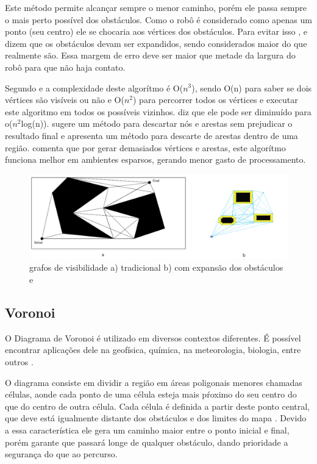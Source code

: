 Este método permite alcançar sempre o menor caminho, porém ele passa sempre o mais perto possível dos obstáculos. Como o robô é considerado como apenas um ponto (seu centro) ele se chocaria aos vértices dos obstáculos. Para evitar isso \cite{Souza2008}, \cite{Siegwart2004} e \cite{Thomsen2010} dizem que os obstáculos devam ser expandidos, sendo considerados maior do que realmente são. Essa margem de erro deve ser maior que metade da largura do robô para que não haja contato.

Segundo \cite{Thomsen2010} e \cite{Choset2005} a complexidade deste algorítmo é O($n^3$), sendo O(n) para saber se dois vértices são visíveis ou não e O($n^2$) para percorrer todos os vértices e executar este algoritmo em todos os possíveis vizinhos. \cite{Thomsen2010} diz que ele pode ser diminuído para o($n^2$log(n)). \cite{Medeiros2011} sugere um método para descartar nós e arestas sem prejudicar o resultado final e \cite{Choset2005} apresenta um método para descarte de arestas dentro de uma região. \cite{Siegwart2004} comenta que por gerar demasiados vértices e arestas, este algorítmo funciona melhor em ambientes esparsos, gerando menor gasto de processamento.

\begin{figure}[h]
	\centering
	\label{fig07}
		\includegraphics[keepaspectratio=true,scale=0.6]{figuras/7visibilityGraph.png}
	\caption{grafos de visibilidade a) tradicional b) com expansão dos obstáculos \cite{Thomsen2010} e \cite{MRIT_SITE}}
\end{figure}

\subsection{Voronoi}

O Diagrama de Voronoi é utilizado em diversos contextos diferentes. É possível encontrar aplicações dele na geofísica, química, na meteorologia, biologia, entre outros \cite{VORONOI_SITE}.

O diagrama consiste em dividir a região em áreas poligonais menores chamadas células, aonde cada ponto de uma célula esteja mais pŕoximo do seu centro do que do centro de outra célula. Cada célula é definida a partir deste ponto central, que deve está igualmente distante dos obstáculos e dos limites do mapa \cite{Guzman2008}. Devido a essa característica ele gera um caminho maior entre o ponto inicial e final, porém garante que passará longe de qualquer obstáculo, dando prioridade a segurança do que ao percurso.


